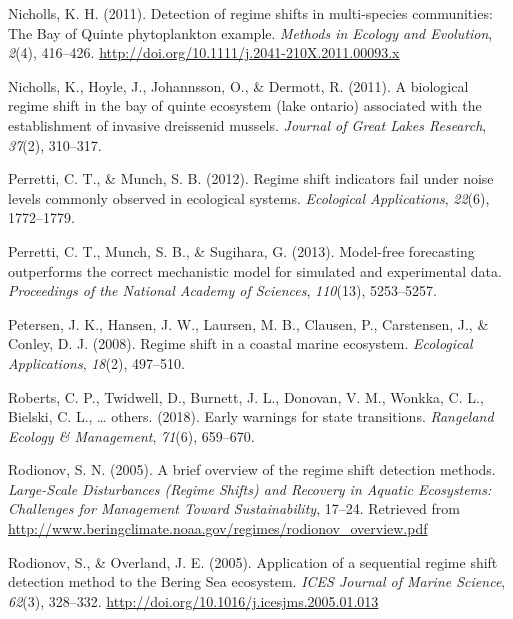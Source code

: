 \documentclass[12pt,twoside,openany]{reedthesis}
\begin{document}
\leavevmode\hypertarget{ref-nicholls_detection_2011}{}%
Nicholls, K. H. (2011). Detection of regime shifts in multi-species communities: The Bay of Quinte phytoplankton example. \emph{Methods in Ecology and Evolution}, \emph{2}(4), 416--426. \url{http://doi.org/10.1111/j.2041-210X.2011.00093.x}

\leavevmode\hypertarget{ref-nicholls2011biological}{}%
Nicholls, K., Hoyle, J., Johannsson, O., \& Dermott, R. (2011). A biological regime shift in the bay of quinte ecosystem (lake ontario) associated with the establishment of invasive dreissenid mussels. \emph{Journal of Great Lakes Research}, \emph{37}(2), 310--317.

\leavevmode\hypertarget{ref-perretti2012regime}{}%
Perretti, C. T., \& Munch, S. B. (2012). Regime shift indicators fail under noise levels commonly observed in ecological systems. \emph{Ecological Applications}, \emph{22}(6), 1772--1779.

\leavevmode\hypertarget{ref-perretti_model-free_2013}{}%
Perretti, C. T., Munch, S. B., \& Sugihara, G. (2013). Model-free forecasting outperforms the correct mechanistic model for simulated and experimental data. \emph{Proceedings of the National Academy of Sciences}, \emph{110}(13), 5253--5257.

\leavevmode\hypertarget{ref-petersen2008regime}{}%
Petersen, J. K., Hansen, J. W., Laursen, M. B., Clausen, P., Carstensen, J., \& Conley, D. J. (2008). Regime shift in a coastal marine ecosystem. \emph{Ecological Applications}, \emph{18}(2), 497--510.

\leavevmode\hypertarget{ref-roberts2018early}{}%
Roberts, C. P., Twidwell, D., Burnett, J. L., Donovan, V. M., Wonkka, C. L., Bielski, C. L., \ldots{} others. (2018). Early warnings for state transitions. \emph{Rangeland Ecology \& Management}, \emph{71}(6), 659--670.

\leavevmode\hypertarget{ref-rodionov_brief_2005}{}%
Rodionov, S. N. (2005). A brief overview of the regime shift detection methods. \emph{Large-Scale Disturbances (Regime Shifts) and Recovery in Aquatic Ecosystems: Challenges for Management Toward Sustainability}, 17--24. Retrieved from \url{http://www.beringclimate.noaa.gov/regimes/rodionov_overview.pdf}

\leavevmode\hypertarget{ref-rodionov_application_2005}{}%
Rodionov, S., \& Overland, J. E. (2005). Application of a sequential regime shift detection method to the Bering Sea ecosystem. \emph{ICES Journal of Marine Science}, \emph{62}(3), 328--332. \url{http://doi.org/10.1016/j.icesjms.2005.01.013}
\end{document}
